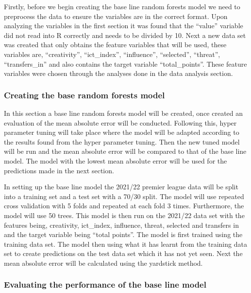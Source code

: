 \documentclass[11pt,preprint, authoryear]{elsarticle}
\numberwithin{equation}{section}
\numberwithin{figure}{section}
\numberwithin{table}{section}
\begin{document}
Firstly, before we begin creating the base line random forests model we
need to preprocess the data to ensure the variables are in the correct
format. Upon analyzing the variables in the first section it was found
that the ``value'' variable did not read into R correctly and needs to
be divided by 10. Next a new data set was created that only obtains the
feature variables that will be used, these variables are,
``creativity'', ``ict\_index'', ``influence'', ``selected'', ``threat'',
``transfers\_in'' and also contains the target variable
``total\_points''. These feature variables were chosen through the
analyses done in the data analysis section.

\hypertarget{creating-the-base-random-forests-model}{%
\subsubsection{Creating the base random forests
model}\label{creating-the-base-random-forests-model}}

In this section a base line random forests model will be created, once
created an evaluation of the mean absolute error will be conducted.
Following this, hyper parameter tuning will take place where the model
will be adapted according to the results found from the hyper parameter
tuning. Then the new tuned model will be run and the mean absolute error
will be compared to that of the base line model. The model with the
lowest mean absolute error will be used for the predictions made in the
next section.

In setting up the base line model the 2021/22 premier league data will
be split into a training set and a test set with a 70/30 split. The
model will use repeated cross validation with 5 folds and repeated at
each fold 3 times. Furthermore, the model will use 50 trees. This model
is then run on the 2021/22 data set with the features being, creativity,
ict\_index, influence, threat, selected and transfers in and the target
variable being ``total points''. The model is first trained using the
training data set. The model then using what it has learnt from the
training data set to create predictions on the test data set which it
has not yet seen. Next the mean absolute error will be calculated using
the yardstick method.

\hypertarget{evaluating-the-performance-of-the-base-line-model}{%
\subsubsection{Evaluating the performance of the base line
model}\label{evaluating-the-performance-of-the-base-line-model}}
\end{document}
